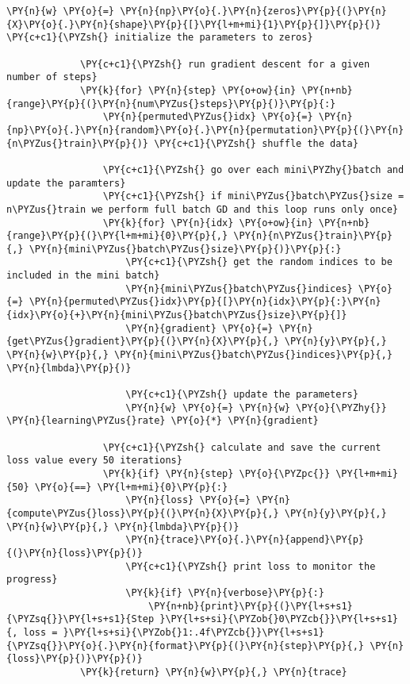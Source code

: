 \begin{Verbatim}[commandchars=\\\{\}]
             \PY{n}{w} \PY{o}{=} \PY{n}{np}\PY{o}{.}\PY{n}{zeros}\PY{p}{(}\PY{n}{X}\PY{o}{.}\PY{n}{shape}\PY{p}{[}\PY{l+m+mi}{1}\PY{p}{]}\PY{p}{)} \PY{c+c1}{\PYZsh{} initialize the parameters to zeros}
             
             \PY{c+c1}{\PYZsh{} run gradient descent for a given number of steps}
             \PY{k}{for} \PY{n}{step} \PY{o+ow}{in} \PY{n+nb}{range}\PY{p}{(}\PY{n}{num\PYZus{}steps}\PY{p}{)}\PY{p}{:}
                 \PY{n}{permuted\PYZus{}idx} \PY{o}{=} \PY{n}{np}\PY{o}{.}\PY{n}{random}\PY{o}{.}\PY{n}{permutation}\PY{p}{(}\PY{n}{n\PYZus{}train}\PY{p}{)} \PY{c+c1}{\PYZsh{} shuffle the data}
                 
                 \PY{c+c1}{\PYZsh{} go over each mini\PYZhy{}batch and update the paramters}
                 \PY{c+c1}{\PYZsh{} if mini\PYZus{}batch\PYZus{}size = n\PYZus{}train we perform full batch GD and this loop runs only once}
                 \PY{k}{for} \PY{n}{idx} \PY{o+ow}{in} \PY{n+nb}{range}\PY{p}{(}\PY{l+m+mi}{0}\PY{p}{,} \PY{n}{n\PYZus{}train}\PY{p}{,} \PY{n}{mini\PYZus{}batch\PYZus{}size}\PY{p}{)}\PY{p}{:}
                     \PY{c+c1}{\PYZsh{} get the random indices to be included in the mini batch}
                     \PY{n}{mini\PYZus{}batch\PYZus{}indices} \PY{o}{=} \PY{n}{permuted\PYZus{}idx}\PY{p}{[}\PY{n}{idx}\PY{p}{:}\PY{n}{idx}\PY{o}{+}\PY{n}{mini\PYZus{}batch\PYZus{}size}\PY{p}{]}
                     \PY{n}{gradient} \PY{o}{=} \PY{n}{get\PYZus{}gradient}\PY{p}{(}\PY{n}{X}\PY{p}{,} \PY{n}{y}\PY{p}{,} \PY{n}{w}\PY{p}{,} \PY{n}{mini\PYZus{}batch\PYZus{}indices}\PY{p}{,} \PY{n}{lmbda}\PY{p}{)}
         
                     \PY{c+c1}{\PYZsh{} update the parameters}
                     \PY{n}{w} \PY{o}{=} \PY{n}{w} \PY{o}{\PYZhy{}} \PY{n}{learning\PYZus{}rate} \PY{o}{*} \PY{n}{gradient}
                 
                 \PY{c+c1}{\PYZsh{} calculate and save the current loss value every 50 iterations}
                 \PY{k}{if} \PY{n}{step} \PY{o}{\PYZpc{}} \PY{l+m+mi}{50} \PY{o}{==} \PY{l+m+mi}{0}\PY{p}{:}
                     \PY{n}{loss} \PY{o}{=} \PY{n}{compute\PYZus{}loss}\PY{p}{(}\PY{n}{X}\PY{p}{,} \PY{n}{y}\PY{p}{,} \PY{n}{w}\PY{p}{,} \PY{n}{lmbda}\PY{p}{)}
                     \PY{n}{trace}\PY{o}{.}\PY{n}{append}\PY{p}{(}\PY{n}{loss}\PY{p}{)}
                     \PY{c+c1}{\PYZsh{} print loss to monitor the progress}
                     \PY{k}{if} \PY{n}{verbose}\PY{p}{:}
                         \PY{n+nb}{print}\PY{p}{(}\PY{l+s+s1}{\PYZsq{}}\PY{l+s+s1}{Step }\PY{l+s+si}{\PYZob{}0\PYZcb{}}\PY{l+s+s1}{, loss = }\PY{l+s+si}{\PYZob{}1:.4f\PYZcb{}}\PY{l+s+s1}{\PYZsq{}}\PY{o}{.}\PY{n}{format}\PY{p}{(}\PY{n}{step}\PY{p}{,} \PY{n}{loss}\PY{p}{)}\PY{p}{)}
             \PY{k}{return} \PY{n}{w}\PY{p}{,} \PY{n}{trace}
\end{Verbatim}

